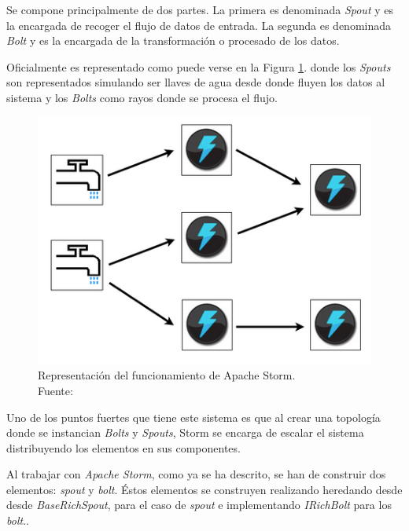 Se compone principalmente de dos partes. La primera es denominada \textit{Spout} y es la encargada de recoger el flujo de datos de entrada. La segunda es denominada \textit{Bolt} y es la encargada de la transformación o procesado de los datos.

Oficialmente es representado como puede verse en la Figura \ref{fig:stormBeLike}. donde los \textit{Spouts} son representados simulando ser llaves de agua desde donde fluyen los datos al sistema y los \textit{Bolts} como rayos donde se procesa el flujo.

\begin{figure}[H]
	\centering
	\captionsetup{justification=centering}
	\includegraphics[scale=0.6]{images/stormBeLike.png}
	\caption[Representación del funcionamiento de Apache Storm.]{Representación del funcionamiento de Apache Storm.\\Fuente: \cite{StormFigure}}
	\label{fig:stormBeLike}
\end{figure}

Uno de los puntos fuertes que tiene este sistema es que al crear una topología donde se instancian \textit{Bolts} y \textit{Spouts}, Storm se encarga de escalar el sistema distribuyendo los elementos en sus componentes.

Al trabajar con \textit{Apache Storm}, como ya se ha descrito, se han de construir dos elementos: \textit{spout} y \textit{bolt}. Éstos elementos se construyen realizando heredando desde desde \textit{BaseRichSpout}, para el caso de \textit{spout} e implementando \textit{IRichBolt} para los \textit{bolt}..

